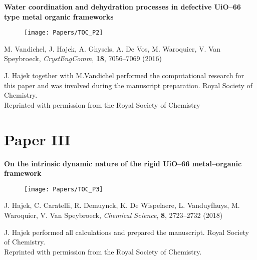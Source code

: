 \vspace{0.1\textheight}
{
\large
\textbf{Water coordination and dehydration processes in defective UiO--66 type
metal organic frameworks} }
\begin{figure}[h!]
	\centering
	\texttt{[image: Papers/TOC\_P2]}
\end{figure}
 
\noindent
M. Vandichel, J. Hajek, A. Ghysels, A. De Vos, M. Waroquier, V. Van Speybroeck,
\textit{CrystEngComm}, \textbf{18}, 7056--7069 (2016)
\npar

\vfill
\noindent J. Hajek together with M.Vandichel performed the computational
research for this paper and was involved during the manuscript preparation.
\npar
\noindent {} Royal Society of Chemistry. \\
Reprinted with permission from the Royal Society of Chemistry

\clearpage{\pagestyle{empty}\cleardoublepage}

 

\clearpage{\pagestyle{empty}\cleardoublepage}


\section*{Paper III}

\vspace{0.1\textheight}
{
\large
\textbf{On the intrinsic dynamic nature of the rigid UiO--66 metal--organic
framework} }
\begin{figure}[h!]
	\centering
	\texttt{[image: Papers/TOC\_P3]}
\end{figure}
 
\noindent
J. Hajek, C. Caratelli, R. Demuynck, K. De Wispelaere, L. Vanduyfhuys, M.
Waroquier, V. Van Speybroeck, \textit{Chemical Science}, \textbf{8}, 2723--2732
(2018)


\vfill

\noindent J. Hajek performed all calculations and prepared the manuscript. 
\npar
\noindent {} Royal Society of Chemistry. \\
Reprinted with permission from the Royal Society of Chemistry.

\clearpage{\pagestyle{empty}\cleardoublepage}


